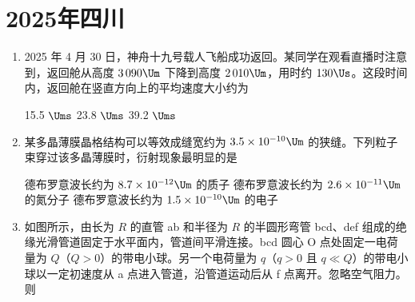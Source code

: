 \documentclass[\gkver]{gaokaozhenti}
\begin{document}
\chapter{2025年四川}

\begin{enumerate}
\item
2025 年 4 月 30 日，神舟十九号载人飞船成功返回。某同学在观看直播时注意到，返回舱从高度 $3\,090 \Um$ 下降到高度 $2\,010 \Um$，用时约 $130 \Us$。这段时间内，返回舱在竖直方向上的平均速度大小约为

{15.5 $\Ums$}
{23.8 $\Ums$}
{39.2 $\Ums$}


\item
某多晶薄膜晶格结构可以等效成缝宽约为 $3.5\times10^{-10} \Um$ 的狭缝。下列粒子束穿过该多晶薄膜时，衍射现象最明显的是

{德布罗意波长约为 $8.7\times10^{-12} \Um$ 的质子}
{德布罗意波长约为 $2.6\times10^{-11} \Um$ 的氮分子}
{德布罗意波长约为 $1.5\times10^{-10} \Um$ 的电子}


\item
如图所示，由长为 $R$ 的直管 ab 和半径为 $R$ 的半圆形弯管 bcd、def 组成的绝缘光滑管道固定于水平面内，管道间平滑连接。bcd 圆心 O 点处固定一电荷量为 $Q$（$Q > 0$）的带电小球。另一个电荷量为 $q$（$q > 0$ 且 $q \ll Q$）的带电小球以一定初速度从 a 点进入管道，沿管道运动后从 f 点离开。忽略空气阻力。则


\end{enumerate}
\end{document}
